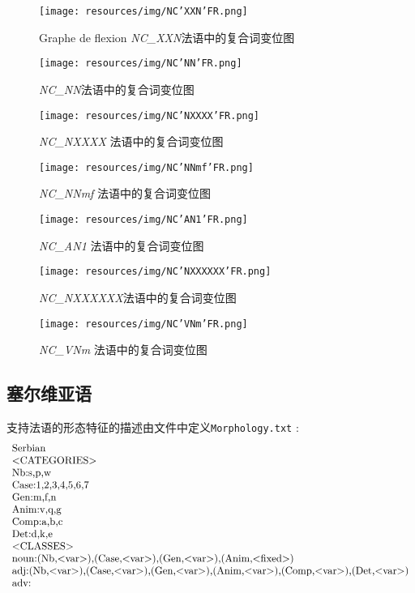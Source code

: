 \begin{figure}[!htb]
  \centering
  \texttt{[image: resources/img/NC'XXN'FR.png]}
  \caption{Graphe de flexion \emph{NC\_XXN}法语中的复合词变位图}
  \label{fig:NC'XXN'FR}
\end{figure}

\begin{figure}[!htb]
  \centering
  \texttt{[image: resources/img/NC'NN'FR.png]}
  \caption{ \emph{NC\_NN}法语中的复合词变位图}
  \label{fig:NC'NN'FR}
\end{figure}

\begin{figure}[!htb]
  \centering
  \texttt{[image: resources/img/NC'NXXXX'FR.png]}
  \caption{\emph{NC\_NXXXX} 法语中的复合词变位图}
  \label{fig:NC'NXXXX'FR}
\end{figure}

\begin{figure}[!htb]
  \centering
  \texttt{[image: resources/img/NC'NNmf'FR.png]}
  \caption{\emph{NC\_NNmf} 法语中的复合词变位图}
  \label{fig:NC'NNmf'FR}
\end{figure}

\begin{figure}[!htb]
  \centering
  \texttt{[image: resources/img/NC'AN1'FR.png]}
  \caption{ \emph{NC\_AN1} 法语中的复合词变位图}
  \label{fig:NC'AN1'FR}
\end{figure}

\begin{figure}[!htb]
  \centering
  \texttt{[image: resources/img/NC'NXXXXXX'FR.png]}
  \caption{ \emph{NC\_NXXXXXX}法语中的复合词变位图}
  \label{fig:NC'NXXXXXX'FR}
\end{figure}

\begin{figure}[!htb]
  \centering
  \texttt{[image: resources/img/NC'VNm'FR.png]}
  \caption{\emph{NC\_VNm} 法语中的复合词变位图}
  \label{fig:NC'VNm'FR}
\end{figure}


\subsection{塞尔维亚语}
支持法语的形态特征的描述由文件中定义\verb+Morphology.txt+ :
\[
\begin{array}[l]{l}
$Serbian$\\
$<CATEGORIES>$\\
$Nb:s,p,w$ \\
$Case:1,2,3,4,5,6,7$\\
$Gen:m,f,n$\\
$Anim:v,q,g$\\
$Comp:a,b,c$\\
$Det:d,k,e$\\
$<CLASSES>$\\
$noun:(Nb,<var>),(Case,<var>),(Gen,<var>),(Anim,<fixed>)$\\
$adj:(Nb,<var>),(Case,<var>),(Gen,<var>),(Anim,<var>),(Comp,<var>),(Det,<var>)$\\
$adv:$
\end{array}
\]

